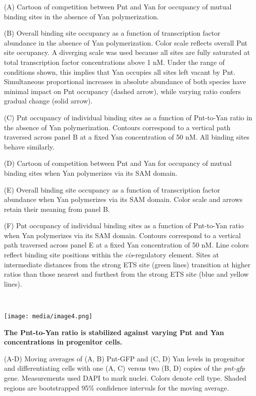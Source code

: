 (A) Cartoon of competition between Pnt and Yan for occupancy of mutual binding sites in the absence of Yan polymerization.

(B) Overall binding site occupancy as a function of transcription factor abundance in the absence of Yan polymerization. Color scale reflects overall Pnt site occupancy. A diverging scale was used because all sites are fully saturated at total transcription factor concentrations above 1 nM. Under the range of conditions shown, this implies that Yan occupies all sites left vacant by Pnt. Simultaneous proportional increases in absolute abundance of both species have minimal impact on Pnt occupancy (dashed arrow), while varying ratio confers gradual change (solid arrow).

(C) Pnt occupancy of individual binding sites as a function of Pnt-to-Yan ratio in the absence of Yan polymerization. Contours correspond to a vertical path traversed across panel B at a fixed Yan concentration of 50 nM. All binding sites behave similarly.

(D) Cartoon of competition between Pnt and Yan for occupancy of mutual binding sites when Yan polymerizes via its SAM domain.

(E) Overall binding site occupancy as a function of transcription factor abundance when Yan polymerizes via its SAM domain. Color scale and arrows retain their meaning from panel B.

(F) Pnt occupancy of individual binding sites as a function of Pnt-to-Yan ratio when Yan polymerizes via its SAM domain. Contours correspond to a vertical path traversed across panel E at a fixed Yan concentration of 50 nM. Line colors reflect binding site positions within the \emph{cis}-regulatory element. Sites at intermediate distances from the strong ETS site (green lines) transition at higher ratios than those nearest and furthest from the strong ETS site (blue and yellow lines).

\textbf{\\
}

\texttt{[image: media/image4.png]}

\textbf{The Pnt-to-Yan ratio is stabilized against varying Pnt and Yan concentrations in progenitor cells.}

(A-D) Moving averages of (A, B) Pnt-GFP and (C, D) Yan levels in progenitor and differentiating cells with one (A, C) versus two (B, D) copies of the \emph{pnt-gfp} gene. Measurements used DAPI to mark nuclei. Colors denote cell type. Shaded regions are bootstrapped 95\% confidence intervals for the moving average.

